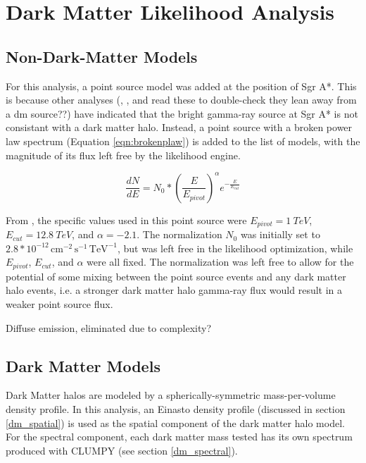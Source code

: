 \section{Dark Matter Likelihood Analysis}
  \subsection{Non-Dark-Matter Models}
  For this analysis, a point source model was added at the position of Sgr A*.
  This is because other analyses (\cite{gc_pnt_is_not_dm1}, \cite{gc_pnt_is_not_dm2}, and \cite{gc_pnt_is_not_dm3} {\color{red}read these to double-check they lean away from a dm source??}) have indicated that the bright gamma-ray source at Sgr A* is not consistant with a dark matter halo.
  Instead, a point source with a broken power law spectrum (Equation \ref{eqn:brokenplaw}) is added to the list of models, with the magnitude of its flux left free by the likelihood engine.
  
  \begin{equation}\label{eqn:brokenplaw}
    \frac{dN}{dE} = N_{0} * { \left ( \frac{E}{E_{pivot}} \right ) }^{\alpha} {e}^{-\frac{E}{E_{cut}}}
  \end{equation}
  
  From \cite{VeritasGCRidge2015}, the specific values used in this point source were $E_{pivot}=\SI{1}{TeV}$, $E_{cut}=\SI{12.8}{TeV}$, and $\alpha=-2.1$.
  The normalization $N_{0}$ was initially set to $2.8*{10}^{-12}\,\text{cm}^{-2}\,\text{s}^{-1}\,\text{TeV}^{-1}$, but was left free in the likelihood optimization, while $E_{pivot}$, $E_{cut}$, and $\alpha$ were all fixed.
  The normalization was left free to allow for the potential of some mixing between the point source events and any dark matter halo events, i.e. a stronger dark matter halo gamma-ray flux would result in a weaker point source flux.
  
  Diffuse emission, eliminated due to complexity?

  \subsection{Dark Matter Models}
  Dark Matter halos are modeled by a spherically-symmetric mass-per-volume density profile.
  In this analysis, an Einasto density profile (discussed in section \ref{dm_spatial}) is used as the spatial component of the dark matter halo model.
  For the spectral component, each dark matter mass tested has its own spectrum produced with CLUMPY (see section \ref{dm_spectral}).

